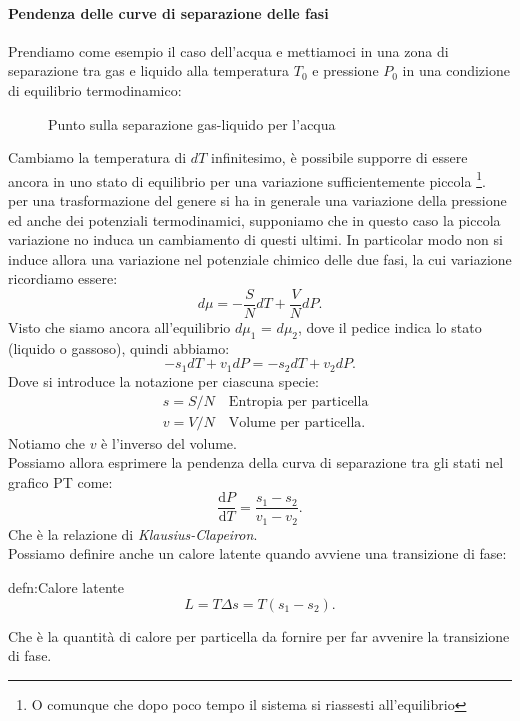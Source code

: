 \paragraph{Pendenza delle curve di separazione delle fasi}%
Prendiamo come esempio il caso dell'acqua e mettiamoci in una zona di separazione tra gas e liquido alla temperatura $T_0$ e pressione $P_0$ in una condizione di equilibrio termodinamico:\\
\begin{figure}[H]
    \centering
    \caption{Punto sulla separazione gas-liquido per l'acqua}
    \label{fig:punto-sulla-separazione-gas-liquido-per-l'acqua}
\end{figure}
\noindent
Cambiamo la temperatura di $dT$ infinitesimo, è possibile supporre di essere ancora in uno stato di equilibrio per una variazione sufficientemente piccola \footnote{O comunque che dopo poco tempo il sistema si riassesti all'equilibrio}.\\
per una trasformazione del genere si ha in generale una variazione della pressione ed anche dei potenziali termodinamici, supponiamo che in questo caso la piccola variazione no induca un cambiamento di questi ultimi. In particolar modo non si induce allora una variazione nel potenziale chimico delle due fasi, la cui variazione ricordiamo essere:
 \[
	d\mu=-\frac{S}{N}dT + \frac{V}{N}dP
.\] 
Visto che siamo ancora all'equilibrio $d\mu_1$ = $d\mu_2$, dove il pedice indica lo stato (liquido o gassoso), quindi abbiamo:
\[
	-s_1 dT + v_1 dP = -s_2 dT + v_2 dP
.\] 
Dove si introduce la notazione per ciascuna specie:
\begin{align}
	&s = S/N \quad \text{Entropia per particella}\\
	&v = V/N \quad \text{Volume per particella}
.\end{align}
Notiamo che $v$ è l'inverso del volume.\\
Possiamo allora esprimere la pendenza della curva di separazione tra gli stati nel grafico PT come:
\[
	\frac{\mbox{d} P}{\mbox{d} T} = \frac{s_1-s_2}{v_1-v_2}
.\] 
Che è la relazione di \textit{Klausius-Clapeiron}.\\
Possiamo definire anche un calore latente quando avviene una transizione di fase: 
\begin{defn}{defn:Calore latente}
\[
	L = T \Delta s = T \left( s_1-s_2 \right) 
.\]
\end{defn}
Che è la quantità di calore per particella da fornire per far avvenire la transizione di fase.\\
